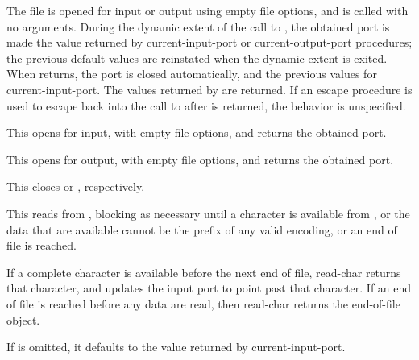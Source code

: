\begin{entry}{%
}

  The
file is opened for input or output using empty file options, and
 is called with no arguments.  During the dynamic extent of
the call to , the obtained port is made the value returned
by {\cf current-input-port} or {\cf current-output-port} procedures;
the previous default values are reinstated when the dynamic extent is
exited.  When  returns, the port is closed automatically,
and the previous values for {\cf current-input-port}.  The values
returned by  are returned.  If an escape procedure is used
to escape back into the call to  after  is
returned, the behavior is unspecified.
\end{entry}

\begin{entry}{%
}

This opens  for input, with empty file options, and returns
the obtained port.
\end{entry}

\begin{entry}{%
}

This opens  for output, with empty file options, and
returns the obtained port.
\end{entry}

\begin{entry}{%
}

This closes  or , respectively.
\end{entry}

\begin{entry}{%
}

This reads from ,
blocking as necessary until a character
is available from ,
or the data that are available cannot
be the prefix of any valid encoding, or an end of file is reached.

If a complete character is available before the next end of file, {\cf
  read-char} returns that character, and updates the input port to
point past that character. If an end of file is
reached before any data are read, then {\cf read-char} returns the
end-of-file object.

If  is omitted, it defaults to the value returned by
{\cf current-input-port}.
\end{entry}

